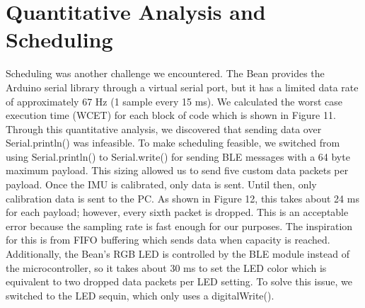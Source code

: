 \documentclass[12pt,journal]{IEEEtran}
\begin{document}
\section{Quantitative Analysis and Scheduling}
Scheduling was another challenge we encountered. The Bean provides the Arduino serial library through a virtual serial port, but it has a limited data rate of approximately 67 Hz (1 sample every 15 ms). We calculated the worst case execution time (WCET) for each block of code which is shown in Figure 11. Through this quantitative analysis, we discovered that sending data over Serial.println() was infeasible.
   To make scheduling feasible, we switched from using Serial.println() to Serial.write() for sending BLE messages with a 64 byte maximum payload. This sizing allowed us to send five custom data packets per payload. Once the IMU is calibrated, only data is sent. Until then, only calibration data is sent to the PC. As shown in Figure 12, this takes about 24 ms for each payload; however, every sixth packet is dropped. This is an acceptable error because the sampling rate is fast enough for our purposes. The inspiration for this is from FIFO buffering which sends data when capacity is reached.
  Additionally, the Bean’s RGB LED is controlled by the BLE module instead of the microcontroller, so it takes about 30 ms to set the LED color which is equivalent to two dropped data packets per LED setting. To solve this issue, we switched to the LED sequin, which only uses a digitalWrite(). 
  
\end{document}
